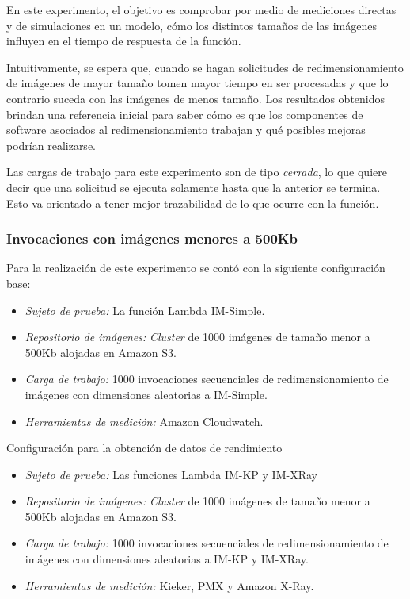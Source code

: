En este experimento, el objetivo es comprobar por medio de mediciones directas y de simulaciones en un modelo, cómo los distintos tamaños de las imágenes influyen en el tiempo de respuesta de la función.

Intuitivamente, se espera que, cuando se hagan solicitudes de redimensionamiento de imágenes de mayor tamaño tomen mayor tiempo en ser procesadas y que lo contrario suceda con las imágenes de menos tamaño. Los resultados obtenidos brindan una referencia inicial para saber cómo es que los componentes de software asociados al redimensionamiento trabajan y qué posibles mejoras podrían realizarse.

Las cargas de trabajo para este experimento son de tipo \emph{cerrada}, lo que quiere decir que una solicitud se ejecuta solamente hasta que la anterior se termina. Esto va orientado a tener mejor trazabilidad de lo que ocurre con la función.



\subsubsection{Invocaciones con imágenes menores a 500Kb}
Para la realización de este experimento se contó con la siguiente configuración base:
\begin{itemize}
    \item \emph{Sujeto de prueba:} La función Lambda IM-Simple.
    \item \emph{Repositorio de imágenes:} \emph{Cluster} de 1000 imágenes de tamaño menor a 500Kb alojadas en Amazon S3.     
    \item \emph{Carga de trabajo:} 1000 invocaciones secuenciales de redimensionamiento de imágenes con dimensiones aleatorias a IM-Simple.
    \item \emph{Herramientas de medición:} Amazon Cloudwatch.
\end{itemize}

Configuración para la obtención de datos de rendimiento

\begin{itemize}
    \item \emph{Sujeto de prueba:} Las funciones Lambda IM-KP y IM-XRay
    \item \emph{Repositorio de imágenes:} \emph{Cluster} de 1000 imágenes de tamaño menor a 500Kb alojadas en Amazon S3.     
    \item \emph{Carga de trabajo:} 1000 invocaciones secuenciales de redimensionamiento de imágenes con dimensiones aleatorias a IM-KP y IM-XRay.
    \item \emph{Herramientas de medición:} Kieker, PMX y Amazon X-Ray.
\end{itemize}


